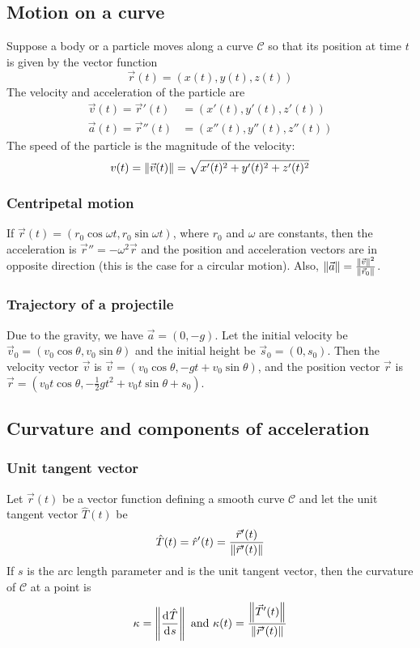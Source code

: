 \documentclass[10pt, twocolumn]{article}
\theoremstyle{remark}
\begin{document}
\subsection{Motion on a curve}
Suppose a body or a particle moves along a curve \(\mathscr{C}\) so that its position at time \(t\) is given by the vector function
\[
  \vec{r}(t) = \left( x(t), y(t), z(t) \right)
\]
The velocity and acceleration of the particle are
\begin{align*}
  \vec{v}(t) = \vec{r}'(t)  & = \left( x'(t), y'(t), z'(t) \right)    \\
  \vec{a}(t) = \vec{r}''(t) & = \left( x''(t), y''(t), z''(t) \right)
\end{align*}
The speed of the particle is the magnitude of the velocity:
\[
  v(t) = \left\| \vec{v}(t) \right\| = \sqrt{x'(t)^2 + y'(t)^2 + z'(t)^2 }
\]

\subsubsection*{Centripetal motion}
If \(\vec{r}(t) = (r_0 \cos\omega t, r_0 \sin\omega t)\), where \(r_0 \) and \(\omega\) are constants, then the acceleration is \(\vec{r}'' = -\omega^2 \vec{r}\) and the position and acceleration vectors are in opposite direction (this is the case for a circular motion).
Also, \(\left\| \vec{a} \right\| = \frac{\left\| \vec{v} \right\|^2 }{\left\| \vec{r}_0  \right\|}\).

\subsubsection*{Trajectory of a projectile}
Due to the gravity, we have \(\vec{a} = (0, -g)\).
Let the initial velocity be \(\vec{v}_0 = (v_0 \cos\theta, v_0 \sin\theta)\) and the initial height be \(\vec{s}_0 = (0, s_0 )\).
Then the velocity vector \(\vec{v}\) is \(\vec{v} = (v_0 \cos\theta, -gt + v_0 \sin\theta)\), and the position vector \(\vec{r}\) is \(\vec{r} = (v_0 t\cos\theta, -\frac{1}{2}gt^2 + v_0 t\sin\theta + s_0 )\).

\subsection{Curvature and components of acceleration}
\subsubsection*{Unit tangent vector}
Let \(\vec{r}(t)\) be a vector function defining a smooth curve \(\mathscr{C}\) and let the unit tangent vector \(\hat{T}(t)\) be
\[
  \hat{T}(t) = \hat{r}'(t) = \frac{\vec{r}'(t)}{\left\| \vec{r}'(t) \right\|}
\]
If \(s\) is the arc length parameter and  is the unit tangent vector, then the curvature of \(\mathscr{C}\) at a point is
\[
  \kappa = \left\| \frac{\mathrm{d}^{} \hat{T}}{\mathrm{d}^{} s} \right\| \text{ and } \kappa(t) = \frac{\left\| \vec{T}'(t) \right\|}{\left\| \vec{r}'(t) \right\|}
\]
\end{document}
